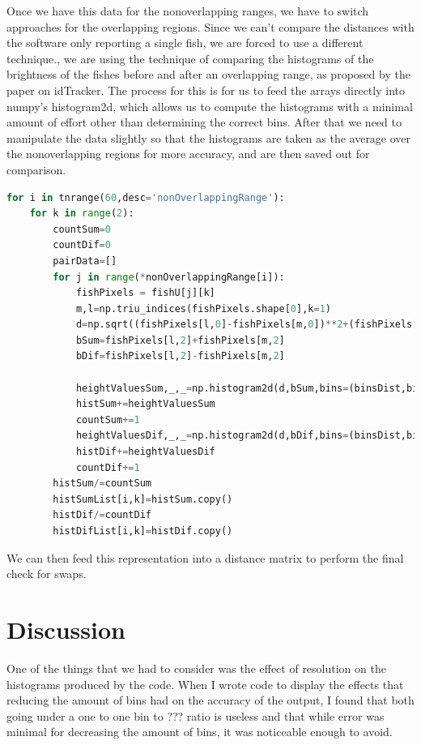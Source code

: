\documentclass[12pt]{article}
\begin{document}
Once we have this data for the nonoverlapping ranges, we have to switch approaches for the overlapping regions. Since we can't compare the distances with the software only reporting a single fish, we are forced to use a different technique., we are using the technique of comparing the histograms of the brightness of the fishes before and after an overlapping range, as proposed by the paper on idTracker\cite{idTracker}. The process for this is for us to feed the arrays directly into numpy's histogram2d, which allows us to compute the histograms with a minimal amount of effort other than determining the correct bins. After that we need to manipulate the data slightly so that the histograms are taken as the average over the nonoverlapping regions for more accuracy, and are then saved out for comparison.

\begin{minipage}[c]{\textwidth}
\begin{lstlisting}[language=Python]
for i in tnrange(60,desc='nonOverlappingRange'):
    for k in range(2):
        countSum=0
        countDif=0
        pairData=[]
        for j in range(*nonOverlappingRange[i]):
            fishPixels = fishU[j][k]
            m,l=np.triu_indices(fishPixels.shape[0],k=1)
            d=np.sqrt((fishPixels[l,0]-fishPixels[m,0])**2+(fishPixels[l,1]-fishPixels[m,1])**2)
            bSum=fishPixels[l,2]+fishPixels[m,2]
            bDif=fishPixels[l,2]-fishPixels[m,2]

            heightValuesSum,_,_=np.histogram2d(d,bSum,bins=(binsDist,binsSum))
            histSum+=heightValuesSum
            countSum+=1
            heightValuesDif,_,_=np.histogram2d(d,bDif,bins=(binsDist,binsDif))
            histDif+=heightValuesDif
            countDif+=1
        histSum/=countSum
        histSumList[i,k]=histSum.copy()
        histDif/=countDif
        histDifList[i,k]=histDif.copy()
\end{lstlisting}
\end{minipage}

We can then feed this representation into a distance matrix to perform the final check for swaps.

\section{Discussion}

One of the things that we had to consider was the effect of resolution on the histograms produced by the code. When I wrote code to display the effects that reducing the amount of bins had on the accuracy of the output, I found that both going under a one to one bin to ??? ratio is useless and that while error was minimal for decreasing the amount of bins, it was noticeable enough to avoid.
\end{document}
